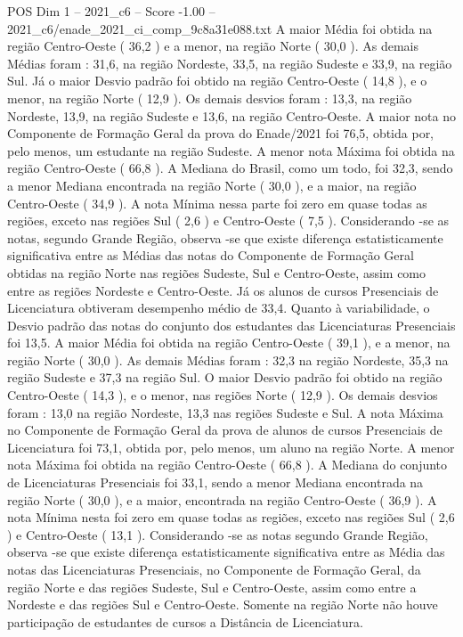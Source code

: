 \begin{textsample}{POS Dim 1 – 2021\_c6 – Score -1.00 – 2021\_c6/enade\_2021\_ci\_comp\_9c8a31e088.txt}
A maior Média foi obtida na região Centro-Oeste ( 36,2 ) e a menor, na região Norte ( 30,0 ).
As demais Médias foram : 31,6, na região Nordeste, 33,5, na região Sudeste e 33,9, na região Sul.
Já o maior Desvio padrão foi obtido na região Centro-Oeste ( 14,8 ), e o menor, na região Norte ( 12,9 ).
Os demais desvios foram : 13,3, na região Nordeste, 13,9, na região Sudeste e 13,6, na região Centro-Oeste.
A maior nota no Componente de Formação Geral da prova do Enade/2021 foi 76,5, obtida por, pelo menos, um estudante na região Sudeste.
A menor nota Máxima foi obtida na região Centro-Oeste ( 66,8 ).
A Mediana do Brasil, como um todo, foi 32,3, sendo a menor Mediana encontrada na região Norte ( 30,0 ), e a maior, na região Centro-Oeste ( 34,9 ).
A nota Mínima nessa parte foi zero em quase todas as regiões, exceto nas regiões Sul ( 2,6 ) e Centro-Oeste ( 7,5 ).
Considerando -se as notas, segundo Grande Região, observa -se que existe diferença estatisticamente significativa entre as Médias das notas do Componente de Formação Geral obtidas na região Norte nas regiões Sudeste, Sul e Centro-Oeste, assim como entre as regiões Nordeste e Centro-Oeste.
Já os alunos de cursos Presenciais de Licenciatura obtiveram desempenho médio de 33,4.
Quanto à variabilidade, o Desvio padrão das notas do conjunto dos estudantes das Licenciaturas Presenciais foi 13,5.
A maior Média foi obtida na região Centro-Oeste ( 39,1 ), e a menor, na região Norte ( 30,0 ).
As demais Médias foram : 32,3 na região Nordeste, 35,3 na região Sudeste e 37,3 na região Sul.
O maior Desvio padrão foi obtido na região Centro-Oeste ( 14,3 ), e o menor, nas regiões Norte ( 12,9 ).
Os demais desvios foram : 13,0 na região Nordeste, 13,3 nas regiões Sudeste e Sul.
A nota Máxima no Componente de Formação Geral da prova de alunos de cursos Presenciais de Licenciatura foi 73,1, obtida por, pelo menos, um aluno na região Norte.
A menor nota Máxima foi obtida na região Centro-Oeste ( 66,8 ).
A Mediana do conjunto de Licenciaturas Presenciais foi 33,1, sendo a menor Mediana encontrada na região Norte ( 30,0 ), e a maior, encontrada na região Centro-Oeste ( 36,9 ).
A nota Mínima nesta foi zero em quase todas as regiões, exceto nas regiões Sul ( 2,6 ) e Centro-Oeste ( 13,1 ).
Considerando -se as notas segundo Grande Região, observa -se que existe diferença estatisticamente significativa entre as Média das notas das Licenciaturas Presenciais, no Componente de Formação Geral, da região Norte e das regiões Sudeste, Sul e Centro-Oeste, assim como entre a Nordeste e das regiões Sul e Centro-Oeste.
Somente na região Norte não houve participação de estudantes de cursos a Distância de Licenciatura.

\end{textsample}
